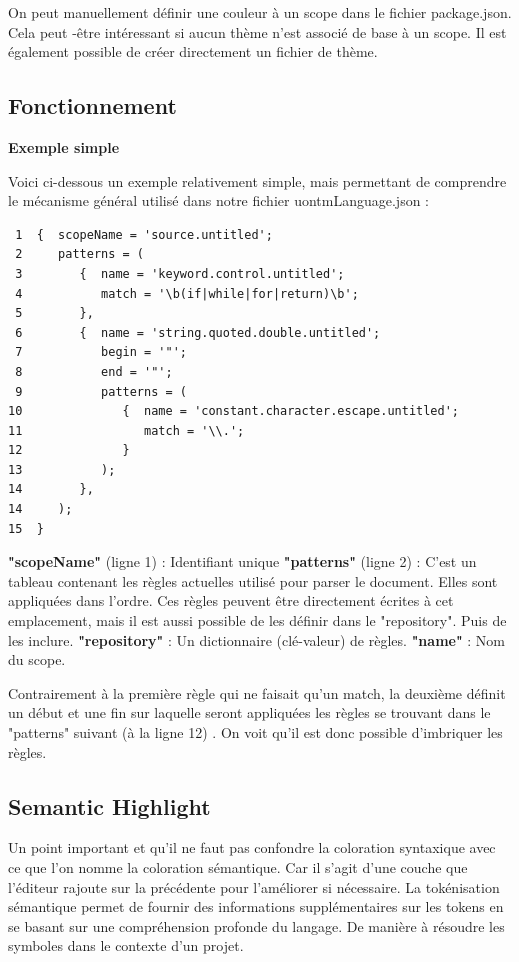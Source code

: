 \documentclass[
    iict, %
    il, %
]{heig-tb}
\begin{document}
On peut manuellement définir une couleur à un scope dans le fichier package.json.
Cela peut -être intéressant si aucun thème n'est associé de base à un scope.
Il est également possible de créer directement un fichier de thème.

\subsection{Fonctionnement}
\textbf{Exemple simple}

Voici ci-dessous un exemple relativement simple, mais permettant de comprendre le mécanisme général utilisé dans notre fichier uontmLanguage.json :
\begin{lstlisting}
 1  {  scopeName = 'source.untitled';
 2     patterns = (
 3        {  name = 'keyword.control.untitled';
 4           match = '\b(if|while|for|return)\b';
 5        },
 6        {  name = 'string.quoted.double.untitled';
 7           begin = '"';
 8           end = '"';
 9           patterns = (
10              {  name = 'constant.character.escape.untitled';
11                 match = '\\.';
12              }
13           );
14        },
14     );
15  }
\end{lstlisting}

\textbf{"scopeName"} (ligne 1) : Identifiant unique
\textbf{"patterns"} (ligne 2) : C'est un tableau contenant les règles actuelles utilisé pour parser le document. Elles sont appliquées dans l'ordre.
Ces règles peuvent être directement écrites à cet emplacement, mais il est aussi possible de les définir dans le "repository". Puis de les inclure.
\textbf{"repository"} : Un dictionnaire (clé-valeur) de règles.
\textbf{"name"} : Nom du scope.

Contrairement à la première règle qui ne faisait qu'un match, la deuxième définit un début et une fin sur laquelle seront appliquées les règles se trouvant dans le "patterns" suivant (à la ligne 12) . On voit qu'il est donc possible d'imbriquer les règles.

\subsection{Semantic Highlight}

Un point important et qu'il ne faut pas confondre la coloration syntaxique avec ce que l'on nomme la coloration sémantique. Car il s'agit d'une couche que l'éditeur rajoute sur la précédente pour l'améliorer si nécessaire.
La tokénisation sémantique permet de fournir des informations supplémentaires sur les tokens en se basant sur une compréhension profonde du langage.
De manière à résoudre les symboles dans le contexte d'un projet.
\end{document}

